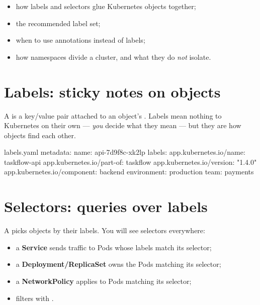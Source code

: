 
\begin{objectives}
\begin{itemize}
  \item how labels and selectors glue Kubernetes objects together;
  \item the recommended label set;
  \item when to use annotations instead of labels;
  \item how namespaces divide a cluster, and what they do \emph{not} isolate.
\end{itemize}
\end{objectives}

\section{Labels: sticky notes on objects}

A  is a key/value pair attached to an object's .
Labels mean nothing to Kubernetes on their own --- \emph{you} decide what they
mean --- but they are how objects find each other.

\begin{yamlcode}{labels.yaml}
metadata:
  name: api-7d9f8c-xk2lp
  labels:
    app.kubernetes.io/name: taskflow-api
    app.kubernetes.io/part-of: taskflow
    app.kubernetes.io/version: "1.4.0"
    app.kubernetes.io/component: backend
    environment: production
    team: payments
\end{yamlcode}

\section{Selectors: queries over labels}

A  picks objects by their labels. You will see selectors
everywhere:

\begin{itemize}
  \item a \textbf{Service} sends traffic to Pods whose labels match its selector;
  \item a \textbf{Deployment/ReplicaSet} owns the Pods matching its selector;
  \item a \textbf{NetworkPolicy} applies to Pods matching its selector;
  \item {} filters with .
\end{itemize}


